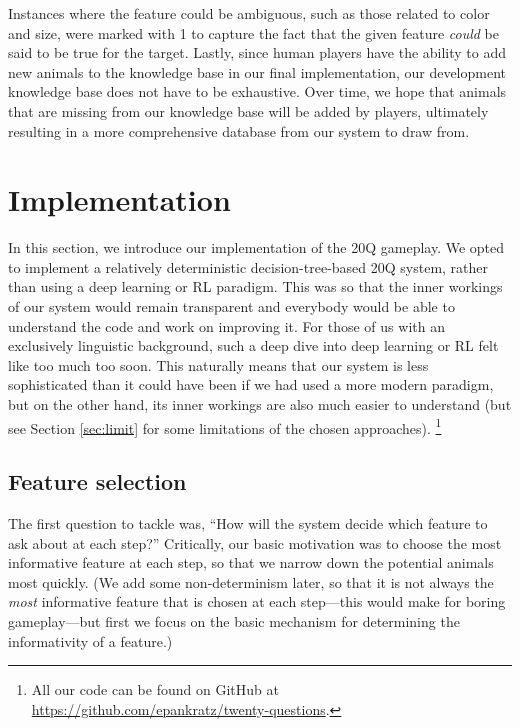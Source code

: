 \documentclass[11pt,a4paper]{article}
\begin{document}
Instances where the feature could be ambiguous, such as those related to color and size, were marked with 1 to capture the fact that the given feature \textit{could} be said to be true for the target.
Lastly, since human players have the ability to add new animals to the knowledge base in our final implementation, our development knowledge base does not have to be exhaustive. 
Over time, we hope that animals that are missing from our knowledge base will be added by players, ultimately resulting in a more comprehensive database from our system to draw from.

\section{Implementation}
\label{sec:impl}

In this section, we introduce our implementation of the 20Q gameplay.
We opted to implement a relatively deterministic decision-tree-based 20Q system, rather than using a deep learning or RL paradigm.
This was so that the inner workings of our system would remain transparent and everybody would be able to understand the code and work on improving it.
For those of us with an exclusively linguistic background, such a deep dive into deep learning or RL felt like too much too soon.
This naturally means that our system is less sophisticated than it could have been if we had used a more modern paradigm, but on the other hand, its inner workings are also much easier to understand (but see Section \ref{sec:limit} for some limitations of the chosen approaches).%
    \footnote{All our code can be found on GitHub at \url{https://github.com/epankratz/twenty-questions}.}

\subsection{Feature selection}
\label{subsec:featselec}

The first question to tackle was, ``How will the system decide which feature to ask about at each step?''
Critically, our basic motivation was to choose the most informative feature at each step, so that we narrow down the potential animals most quickly.
(We add some non-determinism later, so that it is not always the \textit{most} informative feature that is chosen at each step---this would make for boring gameplay---but first we focus on the basic mechanism for determining the informativity of a feature.)
\end{document}
